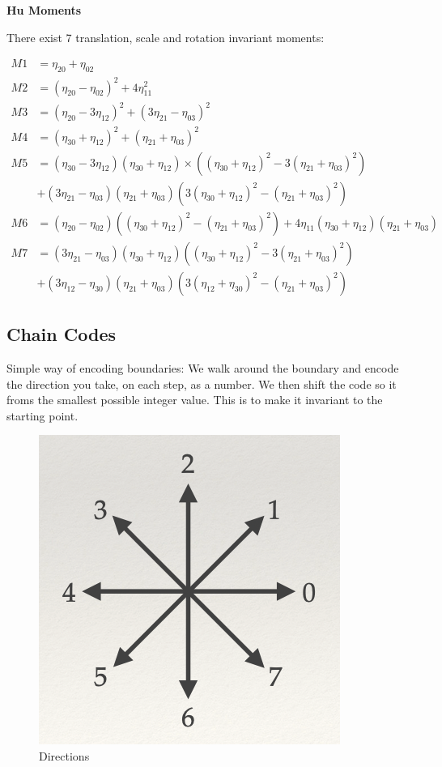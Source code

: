 \noindent\textbf{Hu Moments}

\noindent There exist 7 translation, scale and rotation invariant moments:

\begin{align*}
    M1 &= \eta_{20} +\eta_{02} \\
    M2 &= ( \eta_{20} - \eta_{02} )^{2} + 4\eta_{11}^2 \\
    M3 &= (\eta_{20}-3\eta_{12})^2 + (3\eta_{21}-\eta_{03})^2 \\
    M4 &= (\eta_{30} + \eta_{12})^2 + (\eta_{21}+\eta_{03})^2 \\
    M5 &= (\eta_{30}-3\eta_{12}) (\eta_{30}+\eta_{12}) \times ((\eta_{30}+\eta_{12} )^2 - 3( \eta_{21}+\eta_{03} )^2)  \\ &+ (3\eta_{21}-\eta_{03})(\eta_{21}+\eta_{03})(3(\eta_{30}+\eta_{12})^2 - (\eta_{21}+\eta_{03})^2) \\
    M6 &= (\eta_{20}-\eta_{02}) ((\eta_{30} + \eta_{12})^2 - (\eta_{21}+\eta_{03})^2) + 4\eta_{11}(\eta_{30}+\eta_{12})(\eta_{21}+\eta_{03}) \\
    M7 &= (3\eta_{21}-\eta_{03})(\eta_{30}+\eta_{12})( (\eta_{30}+\eta_{12})^2 - 3(\eta_{21}+\eta_{03})^2) \\ &+ (3\eta_{12}-\eta_{30})(\eta_{21}+\eta_{03})(3(\eta_{12}+\eta_{30})^2 - (\eta_{21}+\eta_{03})^2)
\end{align*}

\subsection{Chain Codes}
Simple way of encoding boundaries: We walk around the boundary and encode the direction you take, on each step, as a number. We then shift the code so it froms the smallest possible integer value. This is to make it invariant to the starting point.

\begin{figure}[!ht]
    \centering
    \includegraphics[scale=0.5]{Images/Chain.png}
    \caption{Directions}
    \label{fig:chain}
\end{figure}

